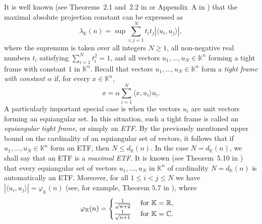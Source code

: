 \documentclass[12pt, reqno]{amsart}
\theoremstyle{definition}
\theoremstyle{remark}
\numberwithin{equation}{section}
\begin{document}
It is well known (see Theorems~2.1 and~2.2 in \cite{chalmerslewicki} or Appendix~A in \cite{foucartskrzypek}) that the maximal absolute projection constant can be expressed as
\begin{equation} \label{formula} \lambda_{\mathbb K}(n) = \sup \sum_{i,j=1}^{N} t_it_j|\langle u_i,u_j\rangle|, 
\end{equation} 
where the supremum is taken over all integers $N\ge1$, all non-negative real numbers $t_i$ satisfying $\sum_{i=1}^{N} t_i^2=1$, and all vectors $u_1,\ldots,u_N\in\mathbb K^n$ forming a tight frame with constant $1$ in $\mathbb K^n$. Recall that vectors $u_1,\ldots,u_N\in\mathbb K^n$ form a \emph{tight frame with constant $\alpha$} if, for every $x\in\mathbb K^n$, 
$$ x=\alpha\sum_{i=1}^{N}\langle x,u_i\rangle u_i. $$
A particularly important special case is when the vectors $u_i$ are unit vectors forming an equiangular set. In this situation, such a tight frame is called an \emph{equiangular tight frame}, or simply an \emph{ETF}. By the previously mentioned upper bound on the cardinality of an equiangular set of vectors, it follows that if $u_1,\ldots,u_N\in\mathbb K^n$ form an ETF, then $N\le d_{\mathbb K}(n)$.
In the case $N=d_{\mathbb{K}}(n)$, we shall say that an ETF is a \emph{maximal ETF}. It is known (see Theorem~5.10 in \cite{foucart}) that every equiangular set of vectors $u_1,\ldots,u_N$ in $\mathbb{K}^n$ of cardinality $N=d_{\mathbb{K}}(n)$ is automatically an ETF. Moreover, for all $1 \leq i < j \leq N$ we have $|\langle u_i, u_j \rangle| = \varphi_{\mathbb{K}}(n)$ (see, for example, Theorem $5.7$ in \cite{foucart}), where
$$\varphi_{\mathbb{K}}(n) = \begin{cases} \frac{1}{\sqrt{n+2}} \quad \hbox{ for } \mathbb{K}=\mathbb{R}, \\
\frac{1}{\sqrt{n+1}} \quad \hbox{ for } \mathbb{K}=\mathbb{C}.
\end{cases}$$
\end{document}
